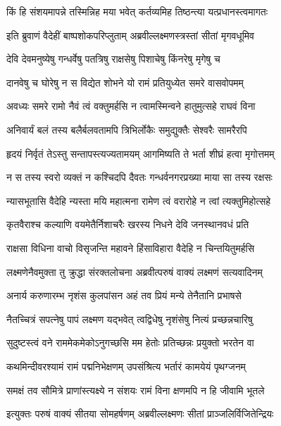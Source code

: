 \twolineshloka
{किं हि संशयमापन्ने तस्मिन्निह मया भवेत्}
{कर्तव्यमिह तिष्ठन्त्या यत्प्रधानस्त्वमागतः} %

\twolineshloka
{इति ब्रुवाणं वैदेहीं बाष्पशोकपरिप्लुताम्}
{अब्रवील्लक्ष्मणस्त्रस्तां सीतां मृगवधूमिव} %

\twolineshloka
{देवि देवमनुष्येषु गन्धर्वेषु पतत्रिषु}
{राक्षसेषु पिशाचेषु किंनरेषु मृगेषु च} %

\twolineshloka
{दानवेषु च घोरेषु न स विद्येत शोभने}
{यो रामं प्रतियुध्येत समरे वासवोपमम्} %

\twolineshloka
{अवध्यः समरे रामो नैवं त्वं वक्तुमर्हसि}
{न त्वामस्मिन्वने हातुमुत्सहे राघवं विना} %

\twolineshloka
{अनिवार्यं बलं तस्य बलैर्बलवतामपि}
{त्रिभिर्लोकैः समुद्युक्तैः सेश्वरैः सामरैरपि} %

\twolineshloka
{हृदयं निर्वृतं तेऽस्तु सन्तापस्त्यज्यतामयम्}
{आगमिष्यति ते भर्ता शीघ्रं हत्वा मृगोत्तमम्} %

\twolineshloka
{न स तस्य स्वरो व्यक्तं न कश्चिदपि दैवतः}
{गन्धर्वनगरप्रख्या माया सा तस्य रक्षसः} %

\twolineshloka
{न्यासभूतासि वैदेहि न्यस्ता मयि महात्मना}
{रामेण त्वं वरारोहे न त्वां त्यक्तुमिहोत्सहे} %

\twolineshloka
{कृतवैराश्च कल्याणि वयमेतैर्निशाचरैः}
{खरस्य निधने देवि जनस्थानवधं प्रति} %

\twolineshloka
{राक्षसा विधिना वाचो विसृजन्ति महावने}
{हिंसाविहारा वैदेहि न चिन्तयितुमर्हसि} %

\twolineshloka
{लक्ष्मणेनैवमुक्ता तु क्रुद्धा संरक्तलोचना}
{अब्रवीत्परुषं वाक्यं लक्ष्मणं सत्यवादिनम्} %

\twolineshloka
{अनार्य करुणारम्भ नृशंस कुलपांसन}
{अहं तव प्रियं मन्ये तेनैतानि प्रभाषसे} %

\twolineshloka
{नैतच्चित्रं सपत्नेषु पापं लक्ष्मण यद्भवेत्}
{त्वद्विधेषु नृशंसेषु नित्यं प्रच्छन्नचारिषु} %

\twolineshloka
{सुदुष्टस्त्वं वने राममेकमेकोऽनुगच्छसि}
{मम हेतोः प्रतिच्छन्नः प्रयुक्तो भरतेन वा} %

\twolineshloka
{कथमिन्दीवरश्यामं रामं पद्मनिभेक्षणम्}
{उपसंश्रित्य भर्तारं कामयेयं पृथग्जनम्} %

\twolineshloka
{समक्षं तव सौमित्रे प्राणांस्त्यक्ष्ये न संशयः}
{रामं विना क्षणमपि न हि जीवामि भूतले} %

\twolineshloka
{इत्युक्तः परुषं वाक्यं सीतया सोमहर्षणम्}
{अब्रवील्लक्ष्मणः सीतां प्राञ्जलिर्विजितेन्द्रियः} %

